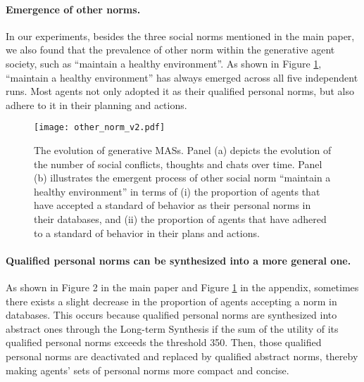 \documentclass{article}
\begin{document}
\begin{appendices}
\paragraph{Emergence of other norms.}
In our experiments, besides the three social norms mentioned in the main paper, we also found that the prevalence of other norm within the generative agent society, such as ``maintain a healthy environment''. As shown in Figure \ref{other norm}, ``maintain a healthy environment'' has always emerged across all five independent runs. Most agents not only adopted it as their qualified personal norms, but also adhere to it in their planning and actions.
\begin{figure}[H]
    \centering
    \texttt{[image: other\_norm\_v2.pdf]}
    \caption{The evolution of generative MASs. Panel (a) depicts the evolution of the number of social conflicts, thoughts and chats over time. Panel (b) illustrates the emergent process of other social norm ``maintain a healthy environment'' in terms of (i) the proportion of agents that have accepted a standard of behavior as their personal norms in their databases, and (ii) the proportion of agents that have adhered to a standard of behavior in their plans and actions.
    }
    \label{other norm}
\end{figure}

\paragraph{Qualified personal norms can be synthesized into a more general one.} As shown in Figure 2 in the main paper and Figure \ref{other norm} in the appendix, sometimes there exists a slight decrease in the proportion of agents accepting a norm in databases. This occurs because qualified personal norms are synthesized into abstract ones through the Long-term Synthesis if the sum of the utility of its qualified personal norms exceeds the threshold 350. Then, those qualified personal norms are deactivated and replaced by qualified abstract norms, thereby making agents' sets of personal norms more compact and concise.

\newpage

\end{appendices}
\end{document}
